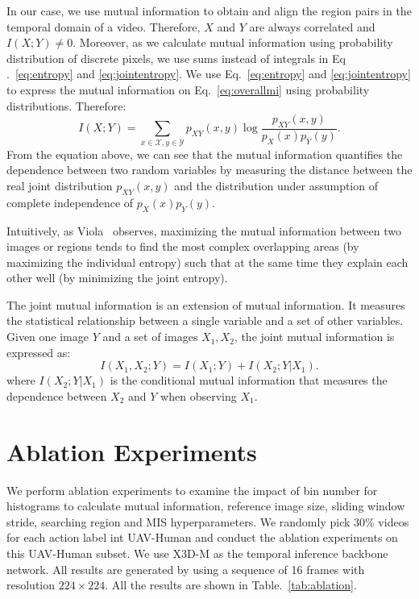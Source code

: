 \documentclass[10pt,twocolumn,letterpaper]{article}
\begin{document}
{\begin{equation}
\end{equation}
In our case, we use mutual information to obtain and align the region pairs in the temporal domain of a video. Therefore, $X$ and $Y$ are always correlated and $I(X;Y) \neq 0$. Moreover, as we calculate mutual information using probability distribution of discrete pixels, we use sums instead of integrals in Eq .~\ref{eq:entropy} and \ref{eq:jointentropy}.
We use Eq.~\ref{eq:entropy} and \ref{eq:jointentropy} to express the mutual information on Eq.~\ref{eq:overallmi} using probability distributions. Therefore:
\begin{equation}\label{eq:miprob}
 I(X;Y)=\sum_{x\in\mathcal{X},y\in\mathcal{Y}}p_{XY}(x,y)\log\frac{p_{XY}(x,y)}{p_X(x)p_Y(y)}.
\end{equation}
From the equation above, we can see that the mutual information quantifies the dependence between two random variables by measuring the distance between the real joint distribution $p_{XY}(x,y)$ and the distribution under assumption of complete independence of $p_X(x)p_Y(y)$.

Intuitively, as Viola~\cite{Viola1995AlignmentBM} observes, maximizing the mutual information between two images or regions tends to find the most complex overlapping areas (by maximizing the individual entropy) such that at the same time they explain each other well (by minimizing the joint entropy). 


The joint mutual information is an extension of mutual information. It measures the statistical relationship between a single variable and a set of other variables. Given one image $Y$ and a set of images $X_1,X_2$, the joint mutual information is expressed as:
\begin{equation}
    I(X_1,X_2;Y)= I(X_1;Y)+I(X_2;Y|X_1).
\end{equation}
where $I(X_2;Y|X_1)$ is the conditional mutual information that measures the dependence between $X_2$ and $Y$ when observing $X_1$.



\section{Ablation Experiments}\label{subsec:ablation}
We perform ablation experiments to examine the impact of bin number for histograms to calculate mutual information, reference image size, sliding window stride, searching region and MIS hyperparameters. We randomly pick $30\%$ videos for each action label int UAV-Human and conduct the ablation experiments on this UAV-Human subset. We use X3D-M\cite{feichtenhofer2020x3d} as the temporal inference backbone network. All results are generated by using a sequence of 16 frames with resolution $224 \times 224$. All the results are shown in Table.~\ref{tab:ablation}.


}
\end{document}
